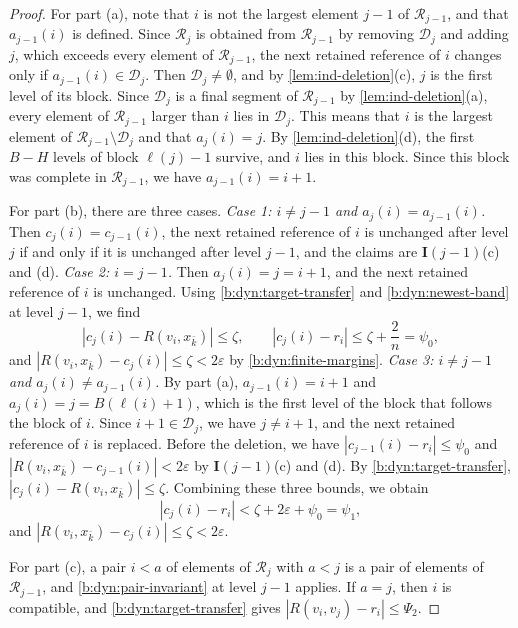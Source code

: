 \begin{proof}
For part (a), note that $i$ is not the largest element $j-1$ of $\mathcal R_{j-1}$, and that $a_{j-1}(i)$ is defined. Since $\mathcal R_j$ is obtained from $\mathcal R_{j-1}$ by removing $\mathcal D_j$ and adding $j$, which exceeds every element of $\mathcal R_{j-1}$, the next retained reference of $i$ changes only if $a_{j-1}(i)\in \mathcal D_j$. Then $\mathcal D_j\neq\emptyset$, and by \cref{lem:ind-deletion}(c), $j$ is the first level of its block. Since $\mathcal D_j$ is a final segment of $\mathcal R_{j-1}$ by \cref{lem:ind-deletion}(a), every element of $\mathcal R_{j-1}$ larger than $i$ lies in $\mathcal D_j$. This means that $i$ is the largest element of $\mathcal R_{j-1}\setminus \mathcal D_j$ and that $a_j(i)=j$. By \cref{lem:ind-deletion}(d), the first $B-H$ levels of block ${\ell}(j)-1$ survive, and $i$ lies in this block. Since this block was complete in $\mathcal R_{j-1}$, we have $a_{j-1}(i)=i+1$.

For part (b), there are three cases.
\emph{Case 1: $i\neq j-1$ and $a_j(i)=a_{j-1}(i)$.} Then $c_j(i)=c_{j-1}(i)$, the next retained reference of $i$ is unchanged after level $j$ if and only if it is unchanged after level $j-1$, and the claims are $\mathbf I(j-1)$(c) and (d).
\emph{Case 2: $i=j-1$.} Then $a_j(i)=j=i+1$, and the next retained reference of $i$ is unchanged. Using \eqref{b:dyn:target-transfer} and \eqref{b:dyn:newest-band} at level $j-1$, we find
\[
 |c_j(i)-R(v_i,x_{\bar k})|\le\zeta,\qquad |c_j(i)-r_i|\le\zeta+\frac2n=\psi_0,
\]
and $|R(v_i,x_{\bar k})-c_j(i)|\le\zeta<2\varepsilon$ by \eqref{b:dyn:finite-margins}.
\emph{Case 3: $i\neq j-1$ and $a_j(i)\neq a_{j-1}(i)$.} By part (a), $a_{j-1}(i)=i+1$ and $a_j(i)=j=B({\ell}(i)+1)$, which is the first level of the block that follows the block of $i$. Since $i+1\in \mathcal D_j$, we have $j\neq i+1$, and the next retained reference of $i$ is replaced. Before the deletion, we have $|c_{j-1}(i)-r_i|\le\psi_0$ and $|R(v_i,x_{\bar k})-c_{j-1}(i)|<2\varepsilon$ by $\mathbf I(j-1)$(c) and (d). By \eqref{b:dyn:target-transfer}, $|c_j(i)-R(v_i,x_{\bar k})|\le\zeta$. Combining these three bounds, we obtain
\[
 |c_j(i)-r_i|<\zeta+2\varepsilon+\psi_0=\psi_1,
\]
and $|R(v_i,x_{\bar k})-c_j(i)|\le\zeta<2\varepsilon$.

For part (c), a pair $i<a$ of elements of $\mathcal R_j$ with $a<j$ is a pair of elements of $\mathcal R_{j-1}$, and \eqref{b:dyn:pair-invariant} at level $j-1$ applies. If $a=j$, then $i$ is compatible, and \eqref{b:dyn:target-transfer} gives $|R(v_i,v_j)-r_i|\le\Psi_2$.
\end{proof}

